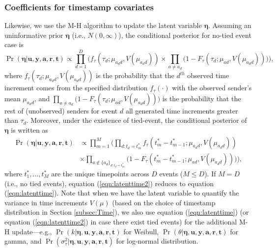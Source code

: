 \documentclass[ba]{imsart}
\numberwithin{equation}{section}
\theoremstyle{plain}
\begin{document}
\subsubsection{Coefficients for timestamp covariates}
Likewise, we use the M-H algorithm to update the latent variable $\boldsymbol{\eta}$. Assuming an uninformative prior $\boldsymbol{\eta}$ (i.e., $N({0},\infty)$), the conditional posterior for no-tied event case is
\begin{equation}
\Pr(\boldsymbol{\eta}| \boldsymbol{u}, \boldsymbol{y},\boldsymbol{a}, \boldsymbol{r},\boldsymbol{t})\propto \prod_{d=1}^D\Big(f_{\tau}(\tau_{d}; \mu_{a_d d}, V(\mu_{a_d d}))\times \prod_{a\neq a_d}\big(1-F_{\tau}(\tau_{d}; \mu_{a d}, V(\mu_{a_d d})) \big)\Big),
\label{eqn:latenttime}
\end{equation}
where $f_{\tau}(\tau_{d}; \mu_{a_d d}, V(\mu_{a_d d}))$ is the probability that the $d^{th}$ observed time increment comes from the specified distribution $f_\tau(\cdot)$ with the observed sender's mean $\mu_{a_d d}$, and $\prod_{a\neq a_d}\big(1-F_{\tau}(\tau_{d}; \mu_{a d},V(\mu_{a_d d})) \big)$ is the probability that the rest of (unobserved) senders for event $d$ all generated time increments greater than $\tau_d$. Moreover, under the existence of tied-event, the conditional posterior of $\boldsymbol{\eta}$ is written as
\begin{equation}
\begin{aligned}
\Pr(\boldsymbol{\eta}| \boldsymbol{u}, \boldsymbol{y},\boldsymbol{a}, \boldsymbol{r},\boldsymbol{t})&\propto \prod_{m=1}^M\Big(\prod_{d:t_d=t_m^*}f_{\tau}(t_m^*-t_{m-1}^*; \mu_{a_d d}, V(\mu_{a_d d})) \\&\times \prod_{a \notin \{a_d\}_{d:t_d=t_m^*}}\big(1-F_{\tau}(t_m^*-t_{m-1}^*; \mu_{a d}, V(\mu_{a_d d})) \big)\Big),
\end{aligned}
\label{eqn:latenttime2}
\end{equation}
where $t_1^*,\ldots,t_M^*$ are the unique timepoints across $D$ events ($M \leq D$). If $M=D$ (i.e., no tied events), equation (\ref{eqn:latenttime2}) reduces to equation (\ref{eqn:latenttime}). Note that when we have the latent variable to quantify the variance in time increments $V(\mu)$ (based on the choice of timestamp distribution in Section \ref{subsec:Time}), we also use equation (\ref{eqn:latenttime}) (or equation (\ref{eqn:latenttime2}) in case there exist tied events) for the additional M-H update---e.g., $\Pr(k| \boldsymbol{\eta},\boldsymbol{u}, \boldsymbol{y},\boldsymbol{a}, \boldsymbol{r},\boldsymbol{t})$ for Weibull, $\Pr(\theta| \boldsymbol{\eta},\boldsymbol{u}, \boldsymbol{y},\boldsymbol{a}, \boldsymbol{r},\boldsymbol{t})$ for gamma, and  $\Pr(\sigma^2_\tau| \boldsymbol{\eta},\boldsymbol{u}, \boldsymbol{y},\boldsymbol{a}, \boldsymbol{r},\boldsymbol{t})$ for log-normal distribution.
\end{document}
